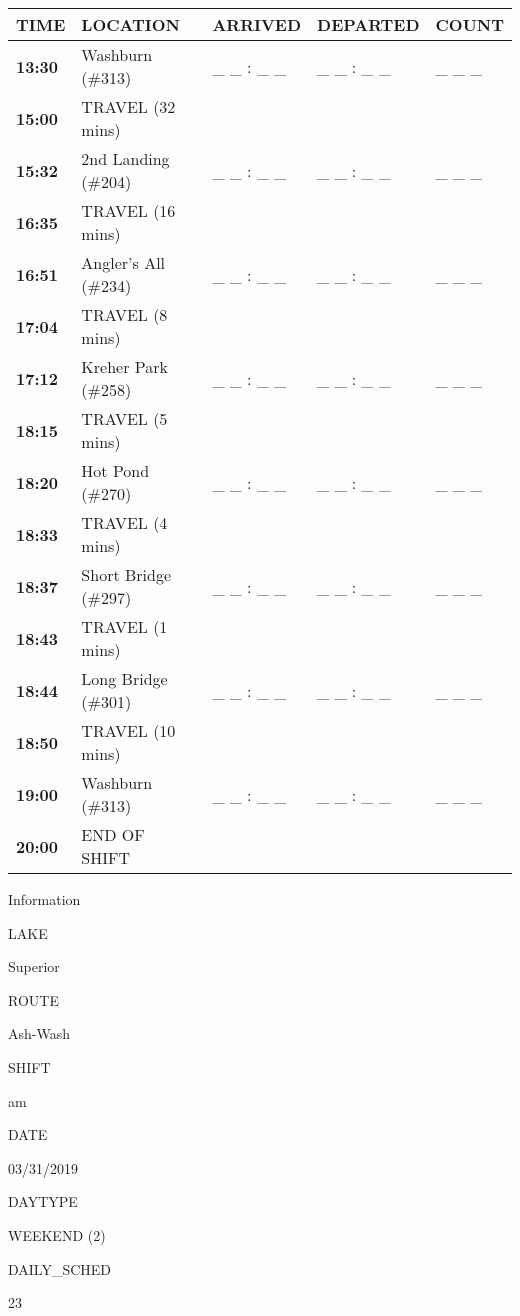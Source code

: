 \documentclass[]{article}
\begin{document}
\begin{tabular}{>{\bfseries}lllll}
\toprule
\textbf{TIME} & \textbf{LOCATION} & \textbf{ARRIVED} & \textbf{DEPARTED} & \textbf{COUNT}\\
\midrule
13:30 & Washburn (\#313) & \_ \_ : \_ \_ & \_ \_ : \_ \_ & \_ \_ \_\\
15:00 & TRAVEL (32 mins) &  &  & \\
15:32 & 2nd Landing (\#204) & \_ \_ : \_ \_ & \_ \_ : \_ \_ & \_ \_ \_\\
16:35 & TRAVEL (16 mins) &  &  & \\
16:51 & Angler's All (\#234) & \_ \_ : \_ \_ & \_ \_ : \_ \_ & \_ \_ \_\\
17:04 & TRAVEL (8 mins) &  &  & \\
17:12 & Kreher Park (\#258) & \_ \_ : \_ \_ & \_ \_ : \_ \_ & \_ \_ \_\\
18:15 & TRAVEL (5 mins) &  &  & \\
18:20 & Hot Pond (\#270) & \_ \_ : \_ \_ & \_ \_ : \_ \_ & \_ \_ \_\\
18:33 & TRAVEL (4 mins) &  &  & \\
18:37 & Short Bridge (\#297) & \_ \_ : \_ \_ & \_ \_ : \_ \_ & \_ \_ \_\\
18:43 & TRAVEL (1 mins) &  &  & \\
18:44 & Long Bridge (\#301) & \_ \_ : \_ \_ & \_ \_ : \_ \_ & \_ \_ \_\\
18:50 & TRAVEL (10 mins) &  &  & \\
19:00 & Washburn (\#313) & \_ \_ : \_ \_ & \_ \_ : \_ \_ & \_ \_ \_\\
20:00 & END OF SHIFT &  &  & \\
\bottomrule
\end{tabular}\newpage

Information

LAKE

Superior

ROUTE

Ash-Wash

SHIFT

am

DATE

03/31/2019

DAYTYPE

WEEKEND (2)

DAILY\_SCHED

23

\vspace{24pt}
\end{document}
